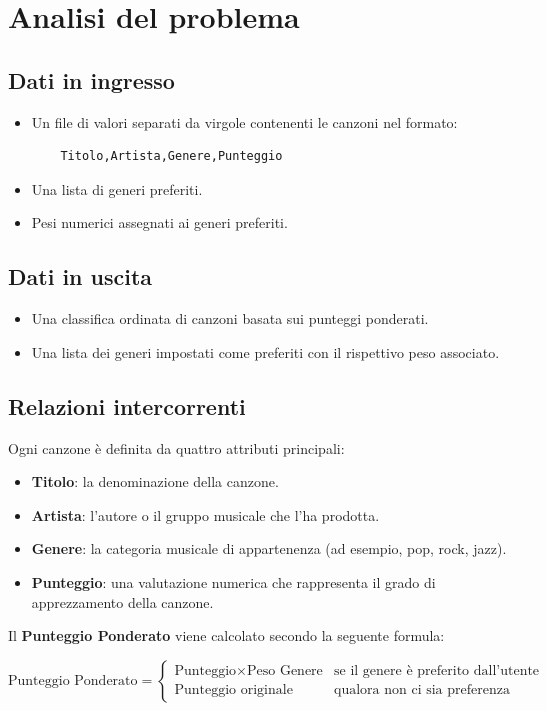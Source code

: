 \documentclass[a4paper,11pt]{article}
\begin{document}
\newpage
\section{Analisi del problema}
\subsection{Dati in ingresso}
\begin{itemize}
    \item Un file di valori separati da virgole contenenti le canzoni nel formato:
    \begin{verbatim}
    Titolo,Artista,Genere,Punteggio
    \end{verbatim}
    \item Una lista di generi preferiti.
    \item Pesi numerici assegnati ai generi preferiti.
\end{itemize}

\subsection{Dati in uscita}
\begin{itemize}
    \item Una classifica ordinata di canzoni basata sui punteggi ponderati.
    \item Una lista dei generi impostati come preferiti con il rispettivo peso associato.
\end{itemize}

\subsection{Relazioni intercorrenti}
Ogni canzone è definita da quattro attributi principali:
\begin{itemize}
    \item \textbf{Titolo}: la denominazione della canzone.  
    \item \textbf{Artista}: l’autore o il gruppo musicale che l’ha prodotta.  
    \item \textbf{Genere}: la categoria musicale di appartenenza (ad esempio, pop, rock, jazz).  
    \item \textbf{Punteggio}: una valutazione numerica che rappresenta il grado di apprezzamento della canzone.  
\end{itemize}

Il \textbf{Punteggio Ponderato} viene calcolato secondo la seguente formula:
\begin{center}
    \textit{
    \[
    \text{Punteggio Ponderato} =
    \begin{cases} 
      \text{Punteggio} \times \text{Peso Genere} & \text{se il genere è preferito dall’utente} \\
      \text{Punteggio originale} & \text{qualora non ci sia preferenza}
    \end{cases}
    \]
    }
\end{center}
\end{document}
